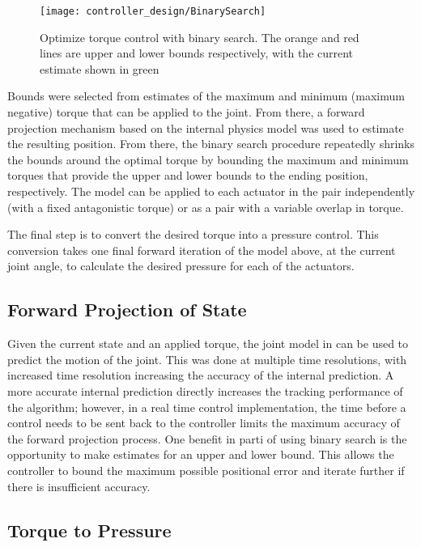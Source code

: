 \begin{figure}
\centering
\texttt{[image: controller\_design/BinarySearch]}
\caption{Optimize torque control with binary search. The orange and red lines are upper and lower bounds respectively, with the current estimate shown in green}
\label{fig:BinarySearch}
\end{figure}

Bounds were selected from estimates
of the maximum and minimum (maximum negative) torque that can be applied to the
joint. From there, a forward projection mechanism based on the internal physics model was
used to estimate the resulting position. From there, the binary search procedure
repeatedly shrinks the bounds around the optimal torque by bounding the maximum and minimum torques that provide the upper and lower bounds to the ending position, respectively. The model can be 
applied to each actuator in the pair independently (with a fixed antagonistic 
torque) or as a pair with a variable overlap in torque. 

The final
step is to convert the desired torque into a pressure control. This conversion takes
one final forward iteration of the model above, at the current joint angle, to 
calculate the desired pressure for each of the actuators.

\subsection{Forward Projection of State}

Given the current state and an applied torque, the joint model in 
 can be used to predict the motion of the joint.
This was done at multiple time resolutions, with increased time resolution 
increasing the accuracy of the internal prediction. A more accurate internal
prediction directly increases the tracking performance of the algorithm;
however, in a real time control implementation, the time before a control needs
to be sent back to the controller limits the maximum accuracy of the forward
projection process. One benefit in parti of using binary search is the
opportunity to make estimates for an upper and lower bound. This allows the 
controller to bound the maximum possible positional error and iterate further
if there is insufficient accuracy.

\subsection{Torque to Pressure}

